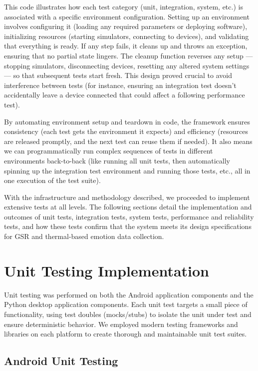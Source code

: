 This code illustrates how each test category (unit, integration, system,
etc.) is associated with a specific environment configuration. Setting
up an environment involves configuring it (loading any required
parameters or deploying software), initializing resources (starting
simulators, connecting to devices), and validating that everything is
ready. If any step fails, it cleans up and throws an exception, ensuring
that no partial state lingers. The cleanup function reverses any setup
--- stopping simulators, disconnecting devices, resetting any altered
system settings --- so that subsequent tests start fresh. This design
proved crucial to avoid interference between tests (for instance,
ensuring an integration test doesn't accidentally leave a device
connected that could affect a following performance test).

By automating environment setup and teardown in code, the framework
ensures consistency (each test gets the environment it expects) and
efficiency (resources are released promptly, and the next test can reuse
them if needed). It also means we can programmatically run complex
sequences of tests in different environments back-to-back (like running
all unit tests, then automatically spinning up the integration test
environment and running those tests, etc., all in one execution of the
test suite).

With the infrastructure and methodology described, we proceeded to
implement extensive tests at all levels. The following sections detail
the implementation and outcomes of unit tests, integration tests, system
tests, performance and reliability tests, and how these tests confirm
that the system meets its design specifications for GSR and
thermal-based emotion data collection.

\section{Unit Testing Implementation}

Unit testing was performed on both the Android application components
and the Python desktop application components. Each unit test targets a
small piece of functionality, using test doubles (mocks/stubs) to
isolate the unit under test and ensure deterministic behavior. We
employed modern testing frameworks and libraries on each platform to
create thorough and maintainable unit test suites.

\subsection{Android Unit Testing}

